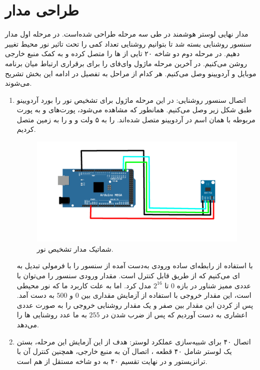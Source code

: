 \documentclass[12pt,a4paper]{article}
\begin{document}
	\newpage
	\section{طراحی مدار}
	مدار نهایی لوستر هوشمند در طی سه مرحله طراحی شده‌است. در مرحله اول مدار سنسور روشنایی بسته شد تا بتوانیم روشنایی تعداد کمی  را تحت تاثیر نور محیط تغییر دهیم. در مرحله دوم دو شاخه ۲۰ تایی از  ها را متصل کرده و به کمک منبع خارجی روشن می‌کنیم. در آخرین مرحله ماژول وای‌فای را برای برقراری ارتباط میان برنامه موبایل و آردویینو وصل می‌کنیم. هر کدام از مراحل به تفصیل در ادامه این بخش تشریح می‌شوند.
	
	\begin{enumerate}
\item اتصال سنسور روشنایی:
در این مرحله ماژول 
برای تشخیص نور را بورد آردویینو طبق شکل زیر وصل می‌کنیم. همانطور که مشاهده می‌شود، پورت‌های
و
به پورت مربوطه با همان اسم در آردویینو متصل شده‌اند. 
را به ۵ ولت و 
و
را به زمین متصل کردیم.
 \begin{figure}[H]
	\centering
	\includegraphics[scale=0.25]{figs/schema.jpg}
	\caption{
		شماتیک مدار تشخیص نور.
	}
	\label{madar}
\end{figure}

با استفاده از رابطه‌ای ساده ورودی به‌دست آمده از سنسور را با فرمولی تبدیل به 
ای می‌کنیم که از طریق 
قابل کنترل است. مقدار ورودی سنسور را می‌توان با عددی ممیز شناور در بازه $0$ تا 
$2^{16}$
مدل کرد. اما به علت کاربرد ما که نور محیطی است، این مقدار خروجی با استفاده از آزمایش مقداری بین $0$ و 
$500$
به دست آمد. پس از 
کردن این مقدار بین صفر و یک مقدار روشنایی خروجی را به صورت عددی اعشاری به دست آوردیم که پس از ضرب شدن در 
$255$
به ما عدد روشنایی 
ها را می‌دهد. 

\item 
اتصال ۴۰  برای شبیه‌سازی عملکرد لوستر:
هدف از این آزمایش این مرحله، بستن یک لوستر شامل ۴۰ قطعه ، اتصال آن به منبع خارجی، همچنین کنترل آن با ترانزیستور و در نهایت تقسیم ۴۰  به دو شاخه مستقل از هم است.


\end{enumerate}
\end{document}
